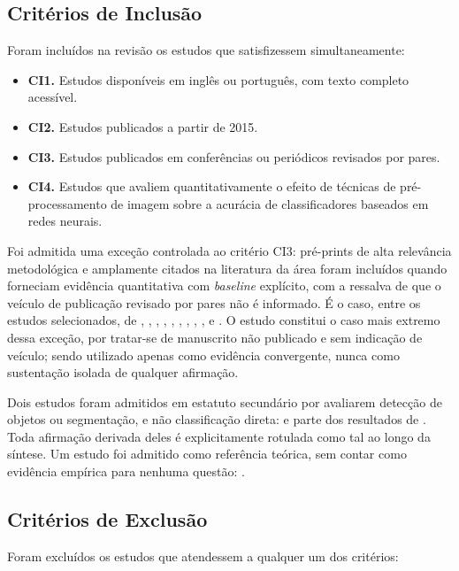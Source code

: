 \documentclass[conference]{IEEEtran}
\begin{document}
\subsection{Critérios de Inclusão}
\label{sec:ci}

Foram incluídos na revisão os estudos que satisfizessem simultaneamente:

\begin{itemize}
\item \textbf{CI1.} Estudos disponíveis em inglês ou português, com texto
completo acessível.
\item \textbf{CI2.} Estudos publicados a partir de 2015.
\item \textbf{CI3.} Estudos publicados em conferências ou periódicos revisados
por pares.
\item \textbf{CI4.} Estudos que avaliem quantitativamente o efeito de técnicas
de pré-processamento de imagem sobre a acurácia de classificadores baseados em
redes neurais.
\end{itemize}

Foi admitida uma exceção controlada ao critério CI3: pré-prints de alta
relevância metodológica e amplamente citados na literatura da área foram
incluídos quando forneciam evidência quantitativa com \textit{baseline}
explícito, com a ressalva de que o veículo de publicação revisado por pares não
é informado. É o caso, entre os estudos selecionados, de
\cite{b4}, \cite{b5}, \cite{b8}, \cite{b9}, \cite{b10}, \cite{b13},
\cite{b14}, \cite{b22}, \cite{b24}, \cite{b26} e \cite{b27}. O estudo
\cite{b24} constitui o caso mais extremo dessa exceção, por tratar-se de
manuscrito não publicado e sem indicação de veículo; sendo utilizado apenas como
evidência convergente, nunca como sustentação isolada de qualquer afirmação.

Dois estudos foram admitidos em estatuto secundário por avaliarem detecção de
objetos ou segmentação, e não classificação direta: \cite{b13} e parte dos resultados
de \cite{b12}. Toda afirmação derivada deles é explicitamente rotulada como tal
ao longo da síntese. Um estudo foi admitido como referência teórica, sem contar
como evidência empírica para nenhuma questão: \cite{b3}.

\subsection{Critérios de Exclusão}
\label{sec:ce}

Foram excluídos os estudos que atendessem a qualquer um dos critérios:
\end{document}

